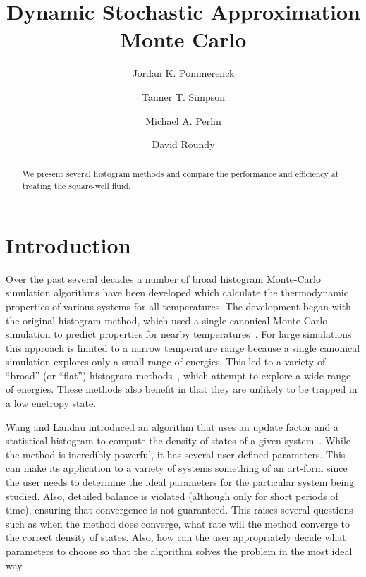 \documentclass[letterpaper,twocolumn,amsmath,amssymb,pre,aps,10pt]{revtex4-1}
\begin{document}
\title{Dynamic Stochastic Approximation Monte Carlo}

\author{Jordan K. Pommerenck} \author{Tanner T. Simpson}
\author{Michael A. Perlin} \author{David Roundy}

\begin{abstract}
  We present several histogram methods and compare the performance and
  efficiency at treating the square-well fluid.
\end{abstract}

\maketitle

\section{Introduction}
Over the past several decades a number of broad histogram Monte-Carlo
simulation algorithms have been developed which calculate the
thermodynamic properties of various systems for all temperatures.  The
development began with the original histogram method, which used a
single canonical Monte Carlo simulation to predict properties for
nearby temperatures~\cite{ferrenberg1988new}.  For large simulations
this approach is limited to a narrow temperature range because a single
canonical simulation explores only a small range of energies.  This led
to a variety of ``broad'' (or ``flat'') histogram
methods~\cite{penna1996broad, penna1998broad, swendsen1999transition,
wang2001determining, wang2001efficient, trebst2004optimizing}, which
attempt to explore a wide range of energies.  These methods also
benefit in that they are unlikely to be trapped in a low enetropy state.

Wang and Landau introduced an algorithm that uses an update factor and
a statistical histogram to compute the density of states of a given
system~\cite{wang2001determining, wang2001efficient}.  While the method
is incredibly powerful, it has several user-defined parameters.  This
can make its application to a variety of systems something of an
art-form since the user needs to determine the ideal parameters for the
particular system being studied.  Also, detailed balance is violated
(although only for short periods of time), ensuring that convergence is
not guaranteed.  This raises several questions such as when the method
does converge, what rate will the method converge to the correct
density of states. Also, how can the user appropriately decide what
parameters to choose so that the algorithm solves the problem in the
most ideal way.
\end{document}
